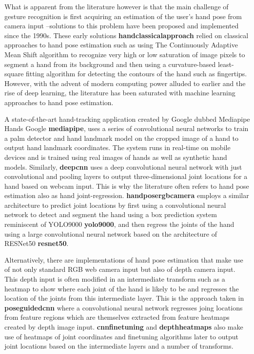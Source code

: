 What is apparent from the literature however is that the main challenge of gesture recognition is first acquiring an estimation of the user’s hand pose from camera input –solutions to this problem have been proposed and implemented since the 1990s. These early solutions \textbf{handclassicalapproach} relied on classical approaches to hand pose estimation such as using The Continuously Adaptive Mean Shift algorithm to recognize very high or low saturation of image pixels to segment a hand from its background and then using a curvature-based least-square fitting algorithm for detecting the contours of the hand such as fingertips. However, with the advent of modern computing power alluded to earlier and the rise of deep learning, the literature has been saturated with machine learning approaches to hand pose estimation. 

A state-of-the-art hand-tracking application created by Google dubbed Mediapipe Hands Google \textbf{mediapipe}, uses a series of convolutional neural networks to train a palm detector and hand landmark model on the cropped image of a hand to output hand landmark coordinates. The system runs in real-time on mobile devices and is trained using real images of hands as well as synthetic hand models. Similarly, \textbf{deepcnn} uses a deep convolutional neural network with just convolutional and pooling layers to output three-dimensional joint locations for a hand based on webcam input. This is why the literature often refers to hand pose estimation also as hand joint-regression. \textbf{handposergbcamera} employs a similar architecture to predict joint locations by first using a convolutional neural network to detect and segment the hand using a box prediction system reminiscent of YOLO9000 \textbf{yolo9000}, and then regress the joints of the hand using a large convolutional neural network based on the architecture of RESNet50 \textbf{resnet50}.

Alternatively, there are implementations of hand pose estimation that make use of not only standard RGB web camera input but also of depth camera input. This depth input is often modified in an intermediate transform such as a heatmap to show where each joint of the hand is likely to be and regresses the location of the joints from this intermediate layer. This is the approach taken in \textbf{poseguidedcnn} where a convolutional neural network regresses joing locations from feature regions which are themselves extracted from feature heatmaps created by depth image input. \textbf{cnnfinetuning} and \textbf{depthheatmaps} also make use of heatmaps of joint coordinates and finetuning algorithms later to output joint locations based on the intermediate layers and a number of transforms. 

